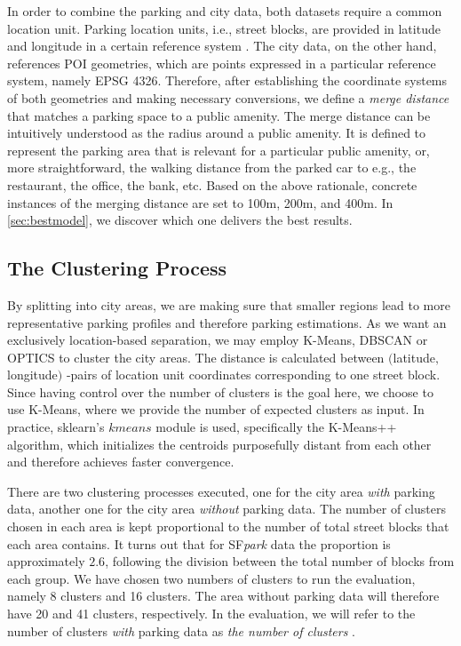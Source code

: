 	In order to combine the parking and city data, both datasets require a common location unit. Parking location units, i.e., street blocks, are provided in latitude and longitude in a certain reference system . The city data, on the other hand, references POI geometries, which are points expressed in a particular reference system, namely EPSG 4326. Therefore, after establishing the coordinate systems of both geometries and making necessary conversions, we define a \textit{merge distance} that matches a parking space to a public amenity. The merge distance can be intuitively understood as the radius around a public amenity. It is defined to represent the parking area that is relevant for a particular public amenity, or, more straightforward, the walking distance from the parked car to e.g., the restaurant, the office, the bank, etc. Based on the above rationale, concrete instances of the merging distance are set to 100m, 200m, and 400m. In \cref{sec:bestmodel}, we discover which one delivers the best results.
	
	\subsection{The Clustering Process}
	By splitting into city areas, we are making sure that smaller regions lead to more representative parking profiles and therefore parking estimations. As we want an exclusively location-based separation, we may employ K-Means, DBSCAN or OPTICS to cluster the city areas. The distance is calculated between $($latitude$,$ longitude$)$ -pairs of location unit coordinates corresponding to one street block. Since having control over the number of clusters is the goal here, we choose to use K-Means, where we provide the number of expected clusters as input.  In practice, sklearn's $kmeans$ module is used, specifically the K-Means++ algorithm, which initializes the centroids purposefully distant from each other and therefore achieves faster convergence.
	
	There are two clustering processes executed, one for the city area \textit{with} parking data, another one for the city area \textit{without} parking data. The number of clusters chosen in each area is kept proportional to the number of total street blocks that each area contains. It turns out that for SF\textit{park} data the proportion is approximately $2.6$, following the division between the total number of blocks from each group. We have chosen two numbers of clusters to run the evaluation, namely 8 clusters and 16 clusters. The area without parking data will therefore have 20 and 41 clusters, respectively. In the evaluation, we will refer to the number of clusters \textit{with} parking data as \textit{the number of clusters} .	
	
